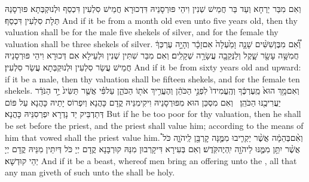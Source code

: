 {וְאִם מִבַּר יַרְחָא וְעַד בַּר חֲמֵישׁ שְׁנִין וִיהֵי פּוּרְסָנֵיהּ דִּדְכוּרָא חֲמֵישׁ סִלְעִין דִּכְסַף וּלְנוּקְבְּתָא פּוּרְסָנַהּ תְּלָת סִלְעִין דִּכְסַף׃}
{And if it be from a month old even unto five years old, then thy valuation shall be for the male five shekels of silver, and for the female thy valuation shall be three shekels of silver.}{}
{וְ֠אִ֠ם מִבֶּן\maqqaf שִׁשִּׁ֨ים שָׁנָ֤ה וָמַ֙עְלָה֙ אִם\maqqaf זָכָ֔ר וְהָיָ֣ה עֶרְכְּךָ֔ חֲמִשָּׁ֥ה עָשָׂ֖ר שָׁ֑קֶל וְלַנְּקֵבָ֖ה עֲשָׂרָ֥ה שְׁקָלִֽים׃}
{וְאִם מִבַּר שִׁתִּין שְׁנִין וּלְעֵילָא אִם דְּכוּרָא וִיהֵי פּוּרְסָנֵיהּ חֲמֵישׁ עֲשַׂר סִלְעִין וּלְנוּקְבְּתָא עֲשַׂר סִלְעִין׃}
{And if it be from sixty years old and upward: if it be a male, then thy valuation shall be fifteen shekels, and for the female ten shekels.}{}
{וְאִם\maqqaf מָ֥ךְ הוּא֙ מֵֽעֶרְכֶּ֔ךָ וְהֶֽעֱמִידוֹ֙ לִפְנֵ֣י הַכֹּהֵ֔ן וְהֶעֱרִ֥יךְ אֹת֖וֹ הַכֹּהֵ֑ן עַל\maqqaf פִּ֗י אֲשֶׁ֤ר תַּשִּׂיג֙ יַ֣ד הַנֹּדֵ֔ר יַעֲרִיכֶ֖נּוּ הַכֹּהֵֽן׃ \setuma }
{וְאִם מִסְכֵּן הוּא מִפּוּרְסָנֵיהּ וִיקִימִנֵּיהּ קֳדָם כָּהֲנָא וְיִפְרוֹס יָתֵיהּ כָּהֲנָא עַל פּוֹם דְּתַדְבֵּיק יַד נָדְרָא יִפְרְסִנֵּיהּ כָּהֲנָא׃}
{But if he be too poor for thy valuation, then he shall be set before the priest, and the priest shall value him; according to the means of him that vowed shall the priest value him.}{}
{וְאִ֨ם\maqqaf בְּהֵמָ֔ה אֲשֶׁ֨ר יַקְרִ֧יבוּ מִמֶּ֛נָּה קׇרְבָּ֖ן לַֽיהֹוָ֑ה כֹּל֩ אֲשֶׁ֨ר יִתֵּ֥ן מִמֶּ֛נּוּ לַיהֹוָ֖ה יִֽהְיֶה\maqqaf קֹּֽדֶשׁ׃}
{וְאִם בְּעִירָא דִּיקָרְבוּן מִנַּהּ קוּרְבָּנָא קֳדָם יְיָ כֹּל דְּיִתֵּין מִנֵּיהּ קֳדָם יְיָ יְהֵי קוּדְשָׁא׃}
{And if it be a beast, whereof men bring an offering unto the \lord, all that any man giveth of such unto the \lord\space shall be holy.}{}
